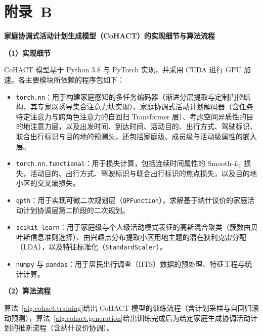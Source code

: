 \setlength{\baselineskip}{16pt}
\chapter{附录~B}\label{appen.b}

\begin{center}
\textbf{家庭协调式活动计划生成模型（CoHACT）的实现细节与算法流程}
\end{center}

\textbf{（1）实现细节}

CoHACT 模型基于 Python 3.8 与 PyTorch 实现，并采用 CUDA 进行 GPU 加速。各主要模块所依赖的程序包如下：

\begin{itemize}
  \item \texttt{torch.nn}：用于构建家庭感知的多任务编码器（渐进分层提取与定制门控结构，其专家以诱导集合注意力块实现）、家庭协调式活动计划解码器（含任务特定注意力与跨角色注意力的自回归 Transformer 层）、考虑空间异质性的目的地注意力层，以及出发时间、到达时间、活动目的、出行方式、驾驶标识、联合出行标识与目的地的预测头，还包括家庭级、成员级与活动级属性的嵌入层。
  \item \texttt{torch.nn.functional}：用于损失计算，包括连续时间属性的 Smooth-$L_1$ 损失，活动目的、出行方式、驾驶标识与联合出行标识的焦点损失，以及目的地小区的交叉熵损失。
  \item \texttt{qpth}：用于实现可微二次规划层（\texttt{QPFunction}），求解基于纳什议价的家庭活动计划协调层第二阶段的二次规划。
  \item \texttt{scikit-learn}：用于家庭级与个人级活动模式表征的高斯混合聚类（簇数由贝叶斯信息准则选择）、由兴趣点分布提取小区用地主题的潜在狄利克雷分配（LDA），以及特征标准化（\texttt{StandardScaler}）。
  \item \texttt{numpy} 与 \texttt{pandas}：用于居民出行调查（HTS）数据的预处理、特征工程与统计计算。
\end{itemize}

\textbf{（2）算法流程}

算法~\ref{alg.cohact.training}给出 CoHACT 模型的训练流程（含计划采样与自回归滚动预测），算法~\ref{alg.cohact.generation}给出训练完成后为给定家庭生成协调活动计划的推断流程（含纳什议价协调）。

